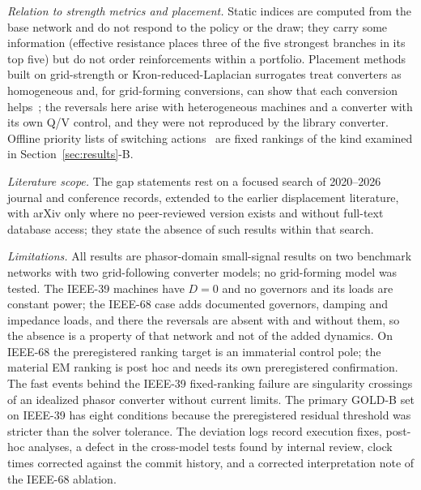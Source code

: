 \documentclass[journal]{IEEEtran}
\theoremstyle{remark}
\begin{document}
\emph{Relation to strength metrics and placement.} Static indices are
computed from the base network and do not respond to the policy or the draw; they
carry some information (effective resistance places three of the five strongest
branches in its top five) but do not order reinforcements within a portfolio.
Placement methods built on grid-strength or Kron-reduced-Laplacian surrogates
treat converters as homogeneous and, for grid-forming conversions, can show that
each conversion helps~\cite{yang2021gfm,xin2025howmany,huang2022gridstructure};
the reversals here arise with heterogeneous machines and a converter with its own
Q/V control, and they were not reproduced by the library converter. Offline
priority lists of switching actions~\cite{khaji2017switching} are fixed rankings
of the kind examined in Section~\ref{sec:results}-B.

\emph{Literature scope.} The gap statements rest on a focused search of
2020--2026 journal and conference records, extended to the earlier displacement
literature, with arXiv only where no peer-reviewed version exists and without
full-text database access; they state the absence of such results within that
search.

\emph{Limitations.} All results are phasor-domain small-signal results on two
benchmark networks with two grid-following converter models; no grid-forming
model was tested. The IEEE-39 machines have $D=0$ and no governors and its loads
are constant power; the IEEE-68 case adds documented governors, damping and
impedance loads, and there the reversals are absent with and without them, so
the absence is a property of that network and not of the added dynamics. On
IEEE-68 the preregistered ranking target is an immaterial control pole; the
material EM ranking is post hoc and needs its own preregistered confirmation. The
fast events behind the IEEE-39 fixed-ranking failure are singularity crossings of
an idealized phasor converter without current limits. The primary GOLD-B set on
IEEE-39 has eight conditions because the preregistered residual threshold was
stricter than the solver tolerance. The deviation logs record execution fixes,
post-hoc analyses, a defect in the cross-model tests found by internal review,
clock times corrected against the commit history, and a corrected interpretation
note of the IEEE-68 ablation.

\end{document}
